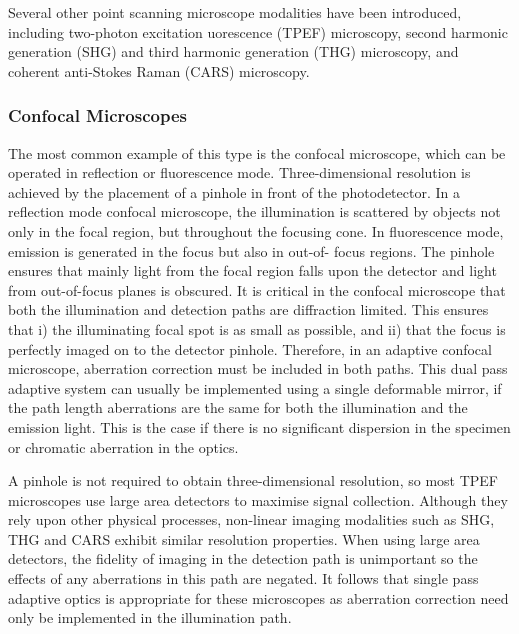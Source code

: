 Several other point scanning microscope modalities have been introduced, 
including two-photon excitation uorescence (TPEF) microscopy, second harmonic 
generation (SHG) and third harmonic generation (THG) microscopy, and coherent 
anti-Stokes Raman (CARS) microscopy.

\subsubsection{Confocal Microscopes}
\label{sec:ConfocalMicroscopes}

The most common example of this type is the confocal microscope, which can be 
operated in reflection or fluorescence mode. Three-dimensional resolution is 
achieved by the placement of a pinhole in front of the photodetector. In a 
reflection mode confocal microscope, the illumination is scattered by objects 
not only in the focal region, but throughout the focusing cone. In 
fluorescence mode, emission is generated in the focus but also in out-of-
focus regions. The pinhole ensures that mainly light from the focal region 
falls upon the detector and light from out-of-focus planes is obscured. It is 
critical in the confocal microscope that both the illumination and detection 
paths are diffraction limited. This ensures that i) the illuminating focal 
spot is as small as possible, and ii) that the focus is perfectly imaged on 
to the detector pinhole. Therefore, in an adaptive confocal microscope, 
aberration correction must be included in both paths. This dual pass adaptive 
system can usually be implemented using a single deformable mirror, if the 
path length aberrations are the same for both the illumination and the 
emission light. This is the case if there is no significant dispersion in the 
specimen or chromatic aberration in the optics.

A pinhole is not required to obtain three-dimensional resolution, so most 
TPEF microscopes use large area detectors to maximise signal collection. 
Although they rely upon other physical processes, non-linear imaging 
modalities such as SHG, THG and CARS exhibit similar resolution properties. 
When using large area detectors, the fidelity of imaging in the detection 
path is unimportant so the effects of any aberrations in this path are 
negated. It follows that single pass adaptive optics is appropriate for these 
microscopes as aberration correction need only be implemented in the 
illumination path.

